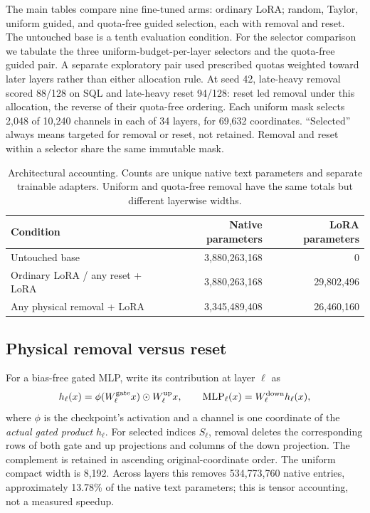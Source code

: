 \documentclass[10pt,letterpaper]{article}
\begin{document}
The main tables compare nine fine-tuned arms: ordinary LoRA; random, Taylor,
uniform guided, and quota-free guided selection, each with removal and reset.
The untouched base is a tenth evaluation condition.
For the selector comparison we tabulate the three uniform-budget-per-layer
selectors and the quota-free guided pair. A separate exploratory pair used
prescribed quotas weighted toward later layers rather than either allocation
rule. At seed 42, late-heavy removal scored 88/128 on SQL and late-heavy reset
94/128: reset led removal under this allocation, the reverse of their
quota-free ordering.
Each uniform mask selects 2,048 of 10,240 channels in each of 34 layers,
for 69,632 coordinates. ``Selected'' always means targeted for removal or
reset, not retained. Removal and reset within a selector share the same
immutable mask.

\begin{table}[htbp]
\centering
\small
\caption{Architectural accounting. Counts are unique
native text parameters and separate trainable adapters. Uniform and
quota-free removal have the same totals but different layerwise widths.}
\label{tab:parameters}
\begin{tabular}{@{}lrr@{}}
\toprule
Condition & Native parameters & LoRA parameters\\
\midrule
Untouched base & 3,880,263,168 & 0\\
Ordinary LoRA / any reset + LoRA & 3,880,263,168 & 29,802,496\\
Any physical removal + LoRA & 3,345,489,408 & 26,460,160\\
\bottomrule
\end{tabular}
\end{table}

\subsection{Physical removal versus reset}
\label{sec:operations}

For a bias-free gated MLP, write its contribution at layer $\ell$ as
\begin{equation}
 h_\ell(x)=\phi(W^{\rm gate}_\ell x)\odot W^{\rm up}_\ell x,
 \qquad
 {\rm MLP}_\ell(x)=W^{\rm down}_\ell h_\ell(x),
 \label{eq:mlp}
\end{equation}
where $\phi$ is the checkpoint's activation and a channel is one coordinate
of the \emph{actual gated product} $h_\ell$. For selected indices $S_\ell$,
removal deletes the corresponding rows of both gate and up projections and
columns of the down projection. The complement is retained in ascending
original-coordinate order. The uniform compact width is 8,192. Across layers
this removes 534,773,760 native entries, approximately 13.78\% of the native
text parameters; this is tensor accounting, not a measured speedup.
\end{document}
